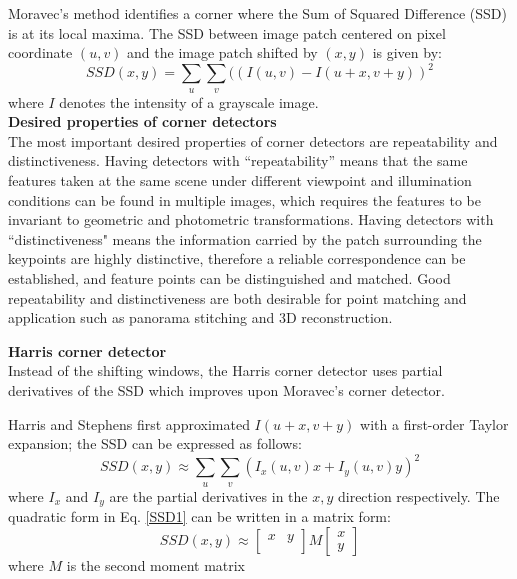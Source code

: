 \documentclass[twoside]{article}
\begin{document}
Moravec's method identifies a corner where the Sum of Squared Difference (SSD) is at its local maxima. The SSD between image patch centered on pixel coordinate $(u,v)$ and the image patch shifted by $(x,y)$ is given by:
\begin{equation}
SSD(x,y) = \sum_u \sum_v ((I(u,v)-I(u+x,v+y))^2
\end{equation}
where $I$ denotes the intensity of a grayscale image. \\

\textbf{Desired properties of corner detectors}\\
The most important desired properties of corner detectors are repeatability and distinctiveness. Having detectors with ``repeatability'' means that the same features taken at the same scene under different viewpoint and illumination conditions can be found in multiple images, which requires the features to be invariant to geometric and photometric transformations. Having detectors with ``distinctiveness" means the information carried by the patch surrounding the keypoints are highly distinctive, therefore a reliable correspondence can be established, and feature points can be distinguished and matched. Good repeatability and distinctiveness are both desirable for point matching and application such as panorama stitching and 3D reconstruction.

\textbf{Harris corner detector}\\
Instead of the shifting windows, the Harris corner detector \cite{Harris} uses partial derivatives of the SSD which improves upon Moravec's corner detector.

Harris and Stephens first approximated $I(u+x,v+y)$ with a first-order Taylor expansion; the SSD can be expressed as follows:
\begin{equation}
SSD(x,y) \approx \sum_u \sum_v (I_x(u,v)x+I_y(u,v)y)^2
\label{SSD1}
\end{equation}
where $I_x$ and $I_y$ are the partial derivatives in the $x, y$ direction respectively. The quadratic form in Eq. \ref{SSD1} can be written in a matrix form:
\begin{equation}
SSD(x,y) \approx
\begin{bmatrix}
x & y\\
\end{bmatrix}
M
\begin{bmatrix}
x \\y
\end{bmatrix}
\end{equation}
where $M$ is the second moment matrix
\end{document}
